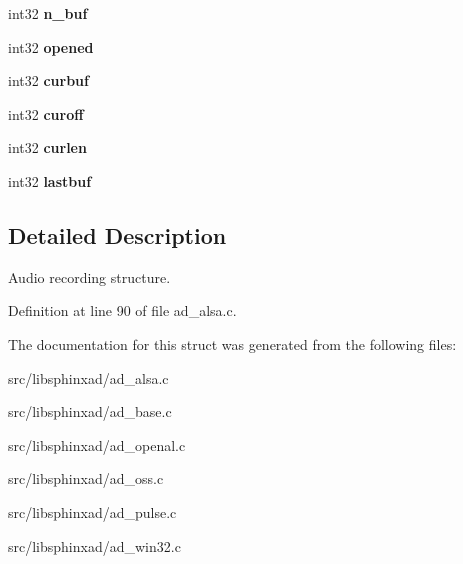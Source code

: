 \begin{DoxyCompactItemize}
\item 
int32 {\bfseries n\-\_\-buf}\label{structad__rec__s_acd8fe38386d84c3e954f2652577c0c7e}

\item 
int32 {\bfseries opened}\label{structad__rec__s_a8f1c8d2056486373a7d87c89e995b8f2}

\item 
int32 {\bfseries curbuf}\label{structad__rec__s_a1eb7456dc028152343c8d538195a8aa3}

\item 
int32 {\bfseries curoff}\label{structad__rec__s_a1c7d3d94fc97bb318cbfe4aa33088b62}

\item 
int32 {\bfseries curlen}\label{structad__rec__s_ab9d6eff8b29d0741ed3b4133a57174ca}

\item 
int32 {\bfseries lastbuf}\label{structad__rec__s_a30b13811b7b97765861b776e29d5d34c}

\end{DoxyCompactItemize}


\subsection{Detailed Description}
Audio recording structure. 

Definition at line 90 of file ad\-\_\-alsa.\-c.



The documentation for this struct was generated from the following files\-:\begin{DoxyCompactItemize}
\item 
src/libsphinxad/ad\-\_\-alsa.\-c\item 
src/libsphinxad/ad\-\_\-base.\-c\item 
src/libsphinxad/ad\-\_\-openal.\-c\item 
src/libsphinxad/ad\-\_\-oss.\-c\item 
src/libsphinxad/ad\-\_\-pulse.\-c\item 
src/libsphinxad/ad\-\_\-win32.\-c\end{DoxyCompactItemize}
